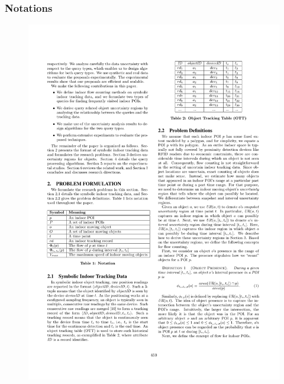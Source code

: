 
\begin{frame}
\frametitle{Notations}

\begin{figure}[tb]
  \includegraphics[width=0.94\columnwidth]{figures/4-1/4-1-1.pdf}
\end{figure}

\end{frame}



